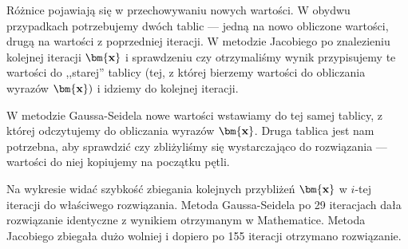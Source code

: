 \documentclass[a4paper,11pt]{article}
\begin{document}
Różnice pojawiają się w przechowywaniu nowych wartości. W obydwu przypadkach potrzebujemy dwóch 
tablic --- jedną na nowo obliczone wartości, drugą na wartości z poprzedniej iteracji.
W metodzie Jacobiego po znalezieniu kolejnej iteracji \(\bm{\text{\bf{x}}}\) i sprawdzeniu czy 
otrzymaliśmy wynik przypisujemy te wartości do ,,starej'' tablicy (tej, z której bierzemy 
wartości do obliczania wyrazów \(\bm{\text{\bf{x}}})\) i idziemy do kolejnej iteracji.

W metodzie Gaussa-Seidela nowe wartości wstawiamy do tej samej tablicy, z której odczytujemy do 
obliczania wyrazów \(\bm{\text{\bf{x}}}\). Druga tablica jest nam potrzebna, aby sprawdzić czy
zbliżyliśmy się wystarczająco do rozwiązania --- wartości do niej kopiujemy na początku pętli.

\pagebreak
Na wykresie widać szybkość zbiegania kolejnych przybliżeń \(\bm{\text{\bf{x}}}\) w \(i\)-tej 
iteracji do właściwego rozwiązania. Metoda Gaussa-Seidela po 29 iteracjach dała rozwiązanie
identyczne z wynikiem otrzymanym w Mathematice. Metoda Jacobiego zbiegała dużo wolniej i dopiero
po 155 iteracji otrzymano rozwiązanie.


\end{document}
